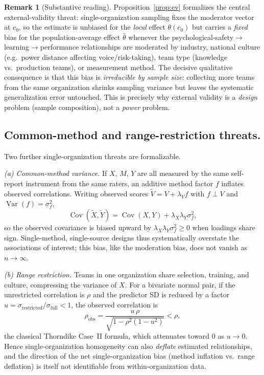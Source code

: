 \documentclass{amsart}
\theoremstyle{definition}
\newtheorem{remark}{Remark}
\begin{document}
\begin{remark}[Substantive reading]
Proposition~\ref{prop:ev} formalizes the central external-validity threat:
single-organization sampling fixes the moderator vector at $c_0$, so the
estimate is unbiased for the \emph{local} effect $\theta(c_0)$ but carries a
\emph{fixed} bias for the population-average effect $\bar\theta$ whenever the
psychological-safety$\to$learning$\to$performance relationships are moderated
by industry, national culture (e.g.\ power distance affecting
voice/risk-taking), team type (knowledge vs.\ production teams), or
measurement method. The decisive qualitative consequence is that this bias
is \emph{irreducible by sample size}: collecting more teams from the same
organization shrinks sampling variance but leaves the systematic
generalization error untouched. This is precisely why external validity is a
\emph{design} problem (sample composition), not a \emph{power} problem.
\end{remark}

\subsection*{Common-method and range-restriction threats.}
Two further single-organization threats are formalizable.

\emph{(a) Common-method variance.} If $X$, $M$, $Y$ are all measured by the
same self-report instrument from the same raters, an additive method factor
$f$ inflates observed correlations. Writing observed scores
$\tilde V = V + \lambda_V f$ with $f\perp V$ and $\operatorname{Var}(f)=\sigma_f^2$,
\[
  \operatorname{Cov}(\tilde X,\tilde Y)
   = \operatorname{Cov}(X,Y) + \lambda_X\lambda_Y\sigma_f^2,
\]
so the observed covariance is biased upward by $\lambda_X\lambda_Y\sigma_f^2\ge0$
when loadings share sign. Single-method, single-source designs thus
systematically overstate the associations of interest; this bias, like the
moderation bias, does not vanish as $n\to\infty$.

\emph{(b) Range restriction.} Teams in one organization share selection,
training, and culture, compressing the variance of $X$. For a bivariate
normal pair, if the unrestricted correlation is $\rho$ and the predictor SD
is reduced by a factor $u=\sigma_{\text{restricted}}/\sigma_{\text{full}}<1$,
the observed correlation is
\[
  \rho_{\text{obs}}=\frac{u\,\rho}{\sqrt{1-\rho^2(1-u^2)}}<\rho,
\]
the classical Thorndike Case~II formula, which attenuates toward $0$ as
$u\to0$. Hence single-organization homogeneity can also \emph{deflate}
estimated relationships, and the direction of the net single-organization
bias (method inflation vs.\ range deflation) is itself not identifiable from
within-organization data.
\end{document}
